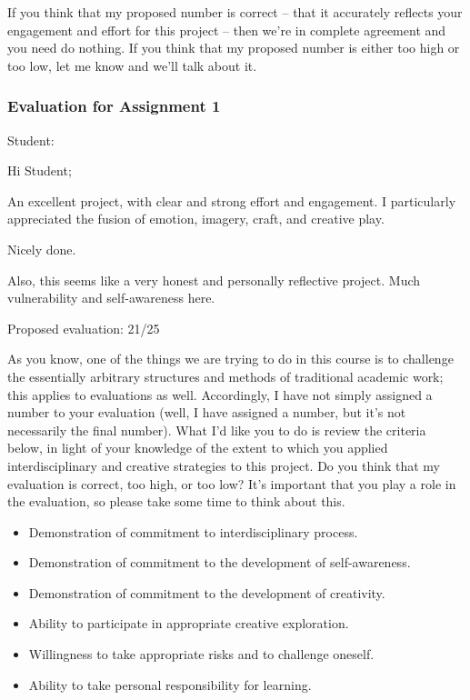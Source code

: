 \documentclass[letterpaper,10pt,DIV=9,headsepline]{scrreprt}
\begin{document}
If you think that my proposed number is correct -- that it accurately
reflects your engagement and effort for this project -- then we're in
complete agreement and you need do nothing. If you think that my
proposed number is either too high or too low, let me know and we'll
talk about it.

\newpage

\subsubsection{Evaluation for Assignment 1}

Student: 

\bigskip
Hi Student;

An excellent project, with clear and strong effort and engagement. I
particularly appreciated the fusion of emotion, imagery, craft, and
creative play.

Nicely done.

Also, this seems like a very honest and personally reflective project.
Much vulnerability and self-awareness here.



\bigskip
Proposed evaluation: 21/25

\bigskip
As you know, one of the things we are trying to do in this course is
to challenge the essentially arbitrary structures and methods of
traditional academic work; this applies to evaluations as well.
Accordingly, I have not simply assigned a number to your evaluation
(well, I have assigned a number, but it's not necessarily the final
number). What I'd like you to do is review the criteria below, in
light of your knowledge of the extent to which you applied
interdisciplinary and creative strategies to this project. Do you
think that my evaluation is correct, too high, or too low? It's
important that you play a role in the evaluation, so please take some
time to think about this.

\begin{itemize}
\item Demonstration of commitment to interdisciplinary process.
\item Demonstration of commitment to the development of self-awareness.
\item Demonstration of commitment to the development of creativity.
\item Ability to participate in appropriate creative exploration.
\item Willingness to take appropriate risks and to challenge oneself.
\item Ability to take personal responsibility for learning.
\end{itemize}
\end{document}
